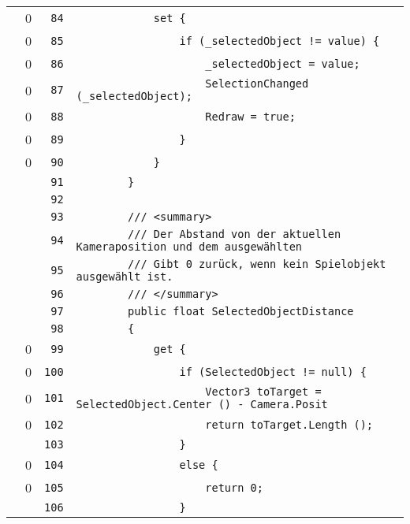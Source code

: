 \documentclass[a4paper,10pt]{article}
\begin{document}
\begin{longtable}[l]{lrrl}
\cellcolor{red} & 0 & \verb~84~ & \verb~            set {~\\
\cellcolor{red} & 0 & \verb~85~ & \verb~                if (_selectedObject != value) {~\\
\cellcolor{red} & 0 & \verb~86~ & \verb~                    _selectedObject = value;~\\
\cellcolor{red} & 0 & \verb~87~ & \verb~                    SelectionChanged (_selectedObject);~\\
\cellcolor{red} & 0 & \verb~88~ & \verb~                    Redraw = true;~\\
\cellcolor{red} & 0 & \verb~89~ & \verb~                }~\\
\cellcolor{red} & 0 & \verb~90~ & \verb~            }~\\
\cellcolor{gray} &  & \verb~91~ & \verb~        }~\\
\cellcolor{gray} &  & \verb~92~ & \verb~~\\
\cellcolor{gray} &  & \verb~93~ & \verb~        /// <summary>~\\
\cellcolor{gray} &  & \verb~94~ & \verb~        /// Der Abstand von der aktuellen Kameraposition und dem ausgewählten ~\\
\cellcolor{gray} &  & \verb~95~ & \verb~        /// Gibt 0 zurück, wenn kein Spielobjekt ausgewählt ist.~\\
\cellcolor{gray} &  & \verb~96~ & \verb~        /// </summary>~\\
\cellcolor{gray} &  & \verb~97~ & \verb~        public float SelectedObjectDistance~\\
\cellcolor{gray} &  & \verb~98~ & \verb~        {~\\
\cellcolor{red} & 0 & \verb~99~ & \verb~            get {~\\
\cellcolor{red} & 0 & \verb~100~ & \verb~                if (SelectedObject != null) {~\\
\cellcolor{red} & 0 & \verb~101~ & \verb~                    Vector3 toTarget = SelectedObject.Center () - Camera.Posit~\\
\cellcolor{red} & 0 & \verb~102~ & \verb~                    return toTarget.Length ();~\\
\cellcolor{gray} &  & \verb~103~ & \verb~                }~\\
\cellcolor{red} & 0 & \verb~104~ & \verb~                else {~\\
\cellcolor{red} & 0 & \verb~105~ & \verb~                    return 0;~\\
\cellcolor{gray} &  & \verb~106~ & \verb~                }~\\

\end{longtable}
\end{document}

